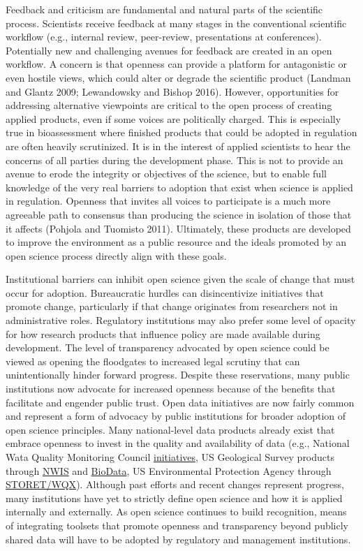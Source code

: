 \documentclass[fleqn,10pt,lineno]{wlpeerj} %
\begin{document}
Feedback and criticism are fundamental and natural parts of the scientific process. Scientists receive feedback at many stages in the conventional scientific workflow (e.g., internal review, peer-review, presentations at conferences). Potentially new and challenging avenues for feedback are created in an open workflow. A concern is that openness can provide a platform for antagonistic or even hostile views, which could alter or degrade the scientific product (Landman and Glantz 2009; Lewandowsky and Bishop 2016). However, opportunities for addressing alternative viewpoints are critical to the open process of creating applied products, even if some voices are politically charged. This is especially true in bioassessment where finished products that could be adopted in regulation are often heavily scrutinized. It is in the interest of applied scientists to hear the concerns of all parties during the development phase. This is not to provide an avenue to erode the integrity or objectives of the science, but to enable full knowledge of the very real barriers to adoption that exist when science is applied in regulation. Openness that invites all voices to participate is a much more agreeable path to consensus than producing the science in isolation of those that it affects (Pohjola and Tuomisto 2011). Ultimately, these products are developed to improve the environment as a public resource and the ideals promoted by an open science process directly align with these goals.

Institutional barriers can inhibit open science given the scale of change that must occur for adoption. Bureaucratic hurdles can disincentivize initiatives that promote change, particularly if that change originates from researchers not in administrative roles. Regulatory institutions may also prefer some level of opacity for how research products that influence policy are made available during development. The level of transparency advocated by open science could be viewed as opening the floodgates to increased legal scrutiny that can unintentionally hinder forward progress. Despite these reservations, many public institutions now advocate for increased openness because of the benefits that facilitate and engender public trust. Open data initiatives are now fairly common and represent a form of advocacy by public institutions for broader adoption of open science principles. Many national-level data products already exist that embrace openness to invest in the quality and availability of data (e.g., National Wata Quality Monitoring Council \href{https://acwi.gov/methods/pubs/over_pubs/valcomp_fs.pdf}{initiatives}, US Geological Survey products through \href{https://waterdata.usgs.gov/nwis}{NWIS} and \href{https://aquatic.biodata.usgs.gov/}{BioData}, US Environmental Protection Agency through \href{https://www.epa.gov/waterdata/water-quality-data-wqx}{STORET/WQX}). Although past efforts and recent changes represent progress, many institutions have yet to strictly define open science and how it is applied internally and externally. As open science continues to build recognition, means of integrating toolsets that promote openness and transparency beyond publicly shared data will have to be adopted by regulatory and management institutions.
\end{document}
